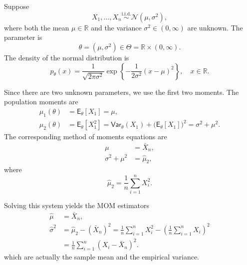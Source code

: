 \begin{ex}
Suppose
\[
X_1, \dots, X_n \overset{\text{i.i.d.}}{\sim} \mathcal{N}(\mu, \sigma^2),
\]
where both the mean \(\mu \in \mathbb{R}\) and the variance
\(\sigma^2 \in (0,\infty)\) are unknown. The parameter is
\[
\theta = (\mu, \sigma^2) \in \Theta = \mathbb{R} \times (0,\infty).
\]
The density of the normal distribution is
\[
p_\theta(x)
= \frac{1}{\sqrt{2\pi\sigma^2}}
\exp\!\left\{
-\frac{1}{2\sigma^2}(x - \mu)^2
\right\},
\quad x \in \mathbb{R}.
\]

Since there are two unknown parameters, we use the first two moments. The
population moments are
\begin{align*}
\mu_1(\theta)
&= \mathsf{E}_\theta[X_1]
= \mu,
\\
\mu_2(\theta)
&= \mathsf{E}_\theta[X_1^2]
= \mathsf{Var}_\theta(X_1) + \bigl(\mathsf{E}_\theta[X_1]\bigr)^2
= \sigma^2 + \mu^2.
\end{align*}
The corresponding method of moments equations are
\begin{align*}
\mu &= \bar X_n, \\
\sigma^2 + \mu^2 &= \hat\mu_2,
\end{align*}
where
\[
\hat\mu_2 = \frac{1}{n} \sum_{i=1}^n X_i^2.
\]

Solving this system yields the MOM estimators
\begin{align*}
\hat\mu &= \bar X_n, \\
\hat\sigma^2
&= \hat\mu_2 - (\bar X_n)^2
= \frac{1}{n} \sum_{i=1}^n X_i^2
- \left( \frac{1}{n} \sum_{i=1}^n X_i \right)^2 \\
&= \frac{1}{n} \sum_{i=1}^n (X_i - \bar X_n)^2.
\end{align*}
which are actually the sample mean and the empirical variance.
\end{ex}



